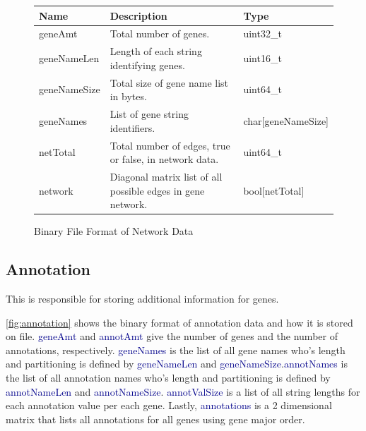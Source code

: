 \documentclass[10pt]{article}
\providecommand{\h}[1]{\textcolor{darkblue}{#1}}
\begin{document}
\begin{figure}[H]
\begin{mdframed}[style=btable]
\begin{tabularx}{\textwidth}{|l|X|l|}
\hline
\textbf{Name} & \textbf{Description} & \textbf{Type} \\
\hline
geneAmt & Total number of genes. & uint32\_t \\
\hline
geneNameLen & Length of each string identifying genes. & uint16\_t \\
\hline
geneNameSize & Total size of gene name list in bytes. & uint64\_t \\
\hline
geneNames & List of gene string identifiers. & char[geneNameSize] \\
\hline
netTotal & Total number of edges, true or false, in network data. & uint64\_t \\
\hline
network & Diagonal matrix list of all possible edges in gene network. & 
bool[netTotal] \\
\hline
\end{tabularx}
\end{mdframed}
\caption{Binary File Format of Network Data}
\label{fig:network}
\end{figure}

\subsection{Annotation}

This is responsible for storing additional information for genes.

\autoref{fig:annotation} shows the binary format of annotation data and how it 
is stored on file. \h{geneAmt} and \h{annotAmt} give the number of genes and 
the number of annotations, respectively. \h{geneNames} is the list of all gene 
names who's length and partitioning is defined by \h{geneNameLen} and 
\h{geneNameSize}.\h{annotNames} is the list of all annotation names who's 
length and partitioning is defined by \h{annotNameLen} and \h{annotNameSize}.
\h{annotValSize} is a list of all string lengths for each annotation value per 
each gene. Lastly, \h{annotations} is a 2 dimensional matrix that lists all 
annotations for all genes using gene major order.
\end{document}
